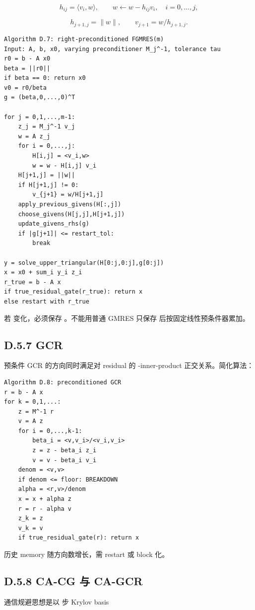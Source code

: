 \documentclass[UTF8,a4paper,10pt]{ctexart}
\DeclareRobustCommand{\pycode}[1]{\texorpdfstring{\texttt{\seqsplit{#1}}}{#1}}
\begin{document}
\begin{displaymath}
h_{ij}=\langle v_i,w\rangle, \qquad w\leftarrow w-h_{ij}v_i,\quad i=0,\ldots,j,
\end{displaymath}

\begin{displaymath}
h_{j+1,j}=\| w\|, \qquad v_{j+1}=w/h_{j+1,j}.
\end{displaymath}

\begin{Verbatim}[breaklines=true,breakanywhere=true,fontsize=\scriptsize]
Algorithm D.7: right-preconditioned FGMRES(m)
Input: A, b, x0, varying preconditioner M_j^-1, tolerance tau
r0 = b - A x0
beta = ||r0||
if beta == 0: return x0
v0 = r0/beta
g = (beta,0,...,0)^T

for j = 0,1,...,m-1:
    z_j = M_j^-1 v_j
    w = A z_j
    for i = 0,...,j:
        H[i,j] = <v_i,w>
        w = w - H[i,j] v_i
    H[j+1,j] = ||w||
    if H[j+1,j] != 0:
        v_{j+1} = w/H[j+1,j]
    apply_previous_givens(H[:,j])
    choose_givens(H[j,j],H[j+1,j])
    update_givens_rhs(g)
    if |g[j+1]| <= restart_tol:
        break

y = solve_upper_triangular(H[0:j,0:j],g[0:j])
x = x0 + sum_i y_i z_i
r_true = b - A x
if true_residual_gate(r_true): return x
else restart with r_true
\end{Verbatim}
若 \pycode{M\_j} 变化，必须保存 \pycode{z\_j}。不能用普通 GMRES 只保存 \pycode{v\_j} 后按固定线性预条件器累加。

\subsection{D.5.7 GCR}
预条件 GCR 的方向同时满足对 residual 的 \pycode{A}-inner-product 正交关系。简化算法：

\begin{Verbatim}[breaklines=true,breakanywhere=true,fontsize=\scriptsize]
Algorithm D.8: preconditioned GCR
r = b - A x
for k = 0,1,...:
    z = M^-1 r
    v = A z
    for i = 0,...,k-1:
        beta_i = <v,v_i>/<v_i,v_i>
        z = z - beta_i z_i
        v = v - beta_i v_i
    denom = <v,v>
    if denom <= floor: BREAKDOWN
    alpha = <r,v>/denom
    x = x + alpha z
    r = r - alpha v
    z_k = z
    v_k = v
    if true_residual_gate(r): return x
\end{Verbatim}
历史 memory 随方向数增长，需 restart 或 block 化。

\subsection{D.5.8 CA-CG 与 CA-GCR}
通信规避思想是以 \pycode{s} 步 Krylov basis
\end{document}
